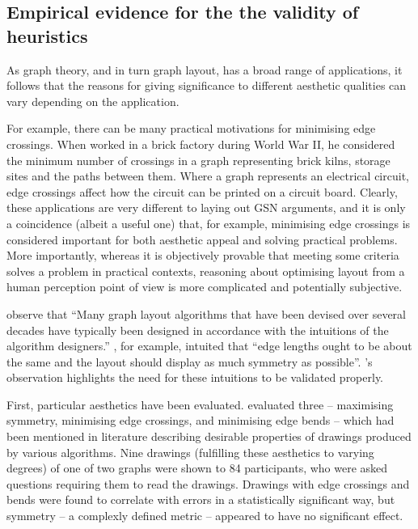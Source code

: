 \subsection{Empirical evidence for the the validity of heuristics}

As graph theory, and in turn graph layout, has a broad range of applications, it follows that the reasons for giving significance to different aesthetic qualities can vary depending on the application.

For example, there can be many practical motivations for minimising edge crossings.
When \citet{JGT:JGT3190010105} worked in a brick factory during World War II,
he considered the minimum number of crossings in a graph representing
brick kilns, storage sites and the paths between them.
Where a graph represents an electrical circuit, edge crossings affect how the circuit can be printed on a circuit board.
Clearly, these applications are very different to laying out GSN arguments, and it is only a coincidence (albeit a useful one) that, for example, minimising edge crossings is considered important for both aesthetic appeal and solving practical problems.
More importantly, whereas it is objectively provable that meeting some criteria solves a problem in practical contexts, reasoning about optimising layout from a human perception point of view is more complicated and potentially subjective.

\citet{5674033} observe that ``Many graph layout algorithms that have been devised over
several decades have typically been designed in accordance with the intuitions of the algorithm designers.''
\citet{eades84}, for example, intuited that ``edge lengths ought to be about the same and the layout should display as much symmetry as possible''.
\citeauthor{5674033}'s observation highlights the need for these intuitions to be validated properly.

First, particular aesthetics have been evaluated. \citet{Purchase1997basis} evaluated three -- maximising symmetry, minimising edge crossings, and minimising edge bends -- which had been mentioned in literature describing desirable properties of drawings produced by various algorithms. 
Nine drawings (fulfilling these aesthetics to varying degrees) of one of two graphs were shown to 84 participants,
who were asked questions requiring them to read the drawings.
Drawings with edge crossings and bends were found to correlate with errors in a statistically significant way, but symmetry -- a complexly defined metric -- appeared to have no significant effect.

